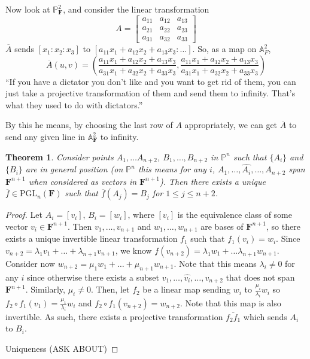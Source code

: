 \documentclass[12pt]{article}
\newcommand{\F}{\mathbf{F}}
\renewcommand{\P}{\mathbb{P}}
\newcommand{\A}{\mathbb{A}}
\newcommand{\PGL}{\mathrm{PGL}}
\newtheorem{theorem}{Theorem}[section]
\begin{document}
    Now look at $\P_\F^2$, and consider the linear transformation
    $$A = \begin{bmatrix}
        a_{11} & a_{12} & a_{13} \\
        a_{21} & a_{22} & a_{23} \\
        a_{31} & a_{32} & a_{33}
    \end{bmatrix}$$
    $\overline{A}$ sends $[x_1: x_2: x_3]$ to $[a_{11}x_1 + a_{12}x_2 + a_{13}x_3: \dots]$. So, as a map on $\A_F^2$,
    $$\overline{A}(u, v) =  \left( \frac{a_{11}x_1 + a_{12}x_2 + a_{13}x_3}{a_{31}x_1 + a_{32}x_2 + a_{33}x_3}, \frac{a_{11}x_1 + a_{12}x_2 + a_{13}x_3}{a_{31}x_1 + a_{32}x_2 + a_{33}x_3}\right)$$
    ``If you have a dictator you don't like and you want to get rid of them, you can just take a projective transformation of them and send them to infinity. That's what they used to do with dictators.'' \par
    By this he means, by choosing the last row of $A$ appropriately, we can get $\overline{A}$ to send any given line in $\A_\F^2$ to infinity.
    \begin{theorem}
        Consider points $A_1, \dots A_{n+2}$, $B_1, \dots, B_{n+2}$ in $\P^n$ such that $\{A_i\}$ and $\{B_i\}$ are in \textit{general position} (on $\P^n$ this means for any $i$, $A_1, \dots, \hat{A_i}, \dots, A_{n+2}$ span $\F^{n+1}$ when considered as vectors in $\F^{n+1}$). Then there exists a unique $\overline{f} \in \PGL_n(\F)$ such that $\overline{f}(A_j) = B_j$ for $1 \leq j \leq n+2$.
    \end{theorem}
    \begin{proof}
        Let $A_i = [v_i]$, $B_i = [w_i]$, where $[v_i]$ is the equivalence class of some vector $v_i \in \F^{n+1}$. Then $v_1, \dots, v_{n+1}$ and $w_1, \dots, w_{n+1}$ are bases of $\F^{n+1}$, so there exists a unique invertible linear transformation $f_1$ such that $f_1(v_i) = w_i$. Since $v_{n+2} = \lambda_1v_1 + \dots + \lambda_{n+1}v_{n+1}$, we know $f(v_{n+2}) = \lambda_1w_1 + \dots \lambda_{n+1}w_{n+1}$. Consider now $w_{n+2} = \mu_1w_1 + \dots + \mu_{n+1}w_{n+1}$. Note that this means $\lambda_i \neq 0$ for any $i$ since otherwise there exists a subset $v_1, \dots, \hat{v_i}, \dots, v_{n+2}$ that does not span $\F^{n+1}$. Similarly, $\mu_i \neq 0$. Then, let $f_2$ be a linear map sending $w_i$ to $\frac{\mu_i}{\lambda_i}w_i$ so $f_2 \circ f_1(v_1) = \frac{\mu_1}{\lambda_i}w_i$ and $f_2 \circ f_1(v_{n+2}) = w_{n+2}$. Note that this map is also invertible. As such, there exists a projective transformation $\overline{f_2f_1}$ which sends $A_i$ to $B_i$. \par
        Uniqueness (ASK ABOUT)
    \end{proof}
\end{document}
